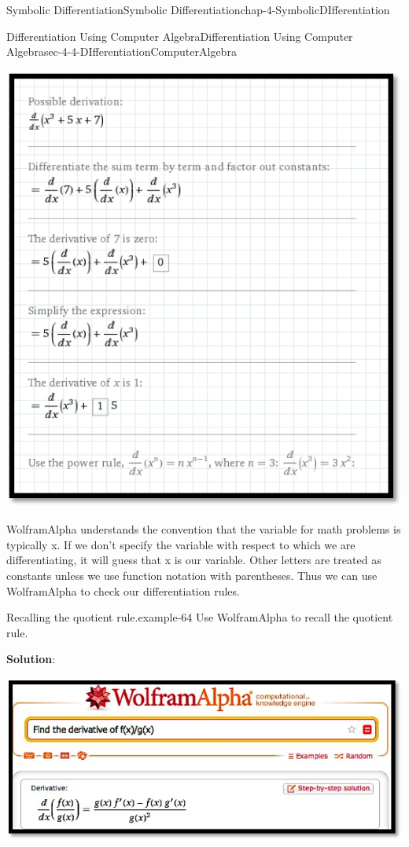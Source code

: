 \documentclass[oneside,10pt,]{book}
\newcommand{\terminology}[1]{\textbf{#1}}
\numberwithin{equation}{section}
\begin{document}
\begin{chapterptx}{Symbolic Differentiation}{}{Symbolic Differentiation}{}{}{chap-4-SymbolicDIfferentiation}
\begin{sectionptx}{Differentiation Using Computer Algebra}{}{Differentiation Using Computer Algebra}{}{}{sec-4-4-DIfferentiationComputerAlgebra}
\begin{sidebyside}{1}{0.15}{0.15}{0}
\begin{sbspanel}{0.7}
\includegraphics[width=1\linewidth]{images/sec4-4-3.png}
\end{sbspanel}%
\end{sidebyside}%
\par
\hypertarget{p-1716}{}%
Wolfram\textbar{}Alpha understands the convention that the variable for math problems is typically x. If we don't specify the variable with respect to which we are differentiating, it will guess that x is our variable. Other letters are treated as constants unless we use function notation with parentheses. Thus we can use Wolfram\textbar{}Alpha to check our differentiation rules.%
\begin{example}{Recalling the quotient rule.}{example-64}%
\hypertarget{p-1717}{}%
Use Wolfram\textbar{}Alpha to recall the quotient rule.%
\par
\hypertarget{p-1718}{}%
\terminology{Solution}:%
\begin{sidebyside}{1}{0.15}{0.15}{0}%
\begin{sbspanel}{0.7}%
\includegraphics[width=1\linewidth]{images/sec4-4-4.png}

\end{sbspanel}
\end{sidebyside}
\end{example}
\end{sectionptx}
\end{chapterptx}
\end{document}
